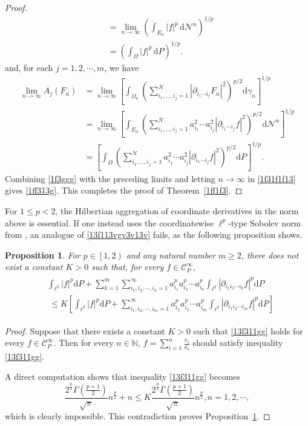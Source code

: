 \documentclass[12pt]{article}
\theoremstyle{plain}
\newtheorem{proposition}[theorem]{Proposition}
\theoremstyle{definition}
\theoremstyle{remark}
\numberwithin{equation}{section}
\newcommand{\nn}{\mathbb{N}}
\begin{document}
\begin{proof}
\[\begin{aligned}
&=\lim_{n\to\infty}
\left(\int_{E_n}|f|^p\,\mathrm d\mathcal N^n\right)^{1/p}\\
&=\left(\int_{\Omega}|f|^p\,\mathrm dP\right)^{1/p}.
\end{aligned}
\]
and, for each $j=1,2,\cdots,m$, we have
\[
\begin{aligned}
\lim_{n\to\infty}A_j(F_n)
&=\lim_{n\to\infty}
\left[
\int_{\Omega_n}
\left(
\sum_{i_1,\ldots,i_j=1}^{N}
|\partial_{i_1\cdots i_j}F_n|^2
\right)^{p/2}\mathrm d\gamma_n
\right]^{1/p}\\
&=\lim_{n\to\infty}
\left[
\int_{E_n}
\left(
\sum_{i_1,\ldots,i_j=1}^{N}
a_{i_1}^2\cdots a_{i_j}^2
|\partial_{i_1\cdots i_j}f|^2
\right)^{p/2}\mathrm d\mathcal N^n
\right]^{1/p}\\
&=
\left[
\int_{\Omega}
\left(
\sum_{i_1,\ldots,i_j=1}^{N}
a_{i_1}^2\cdots a_{i_j}^2
|\partial_{i_1\cdots i_j}f|^2
\right)^{p/2}\mathrm dP
\right]^{1/p}.
\end{aligned}
\]
Combining \eqref{1f3ggg} with the preceding limits and letting $n\to\infty$ in \eqref{1f31f1f13} gives \eqref{1ff313g}.  This completes the proof of Theorem~\ref{1ff1f3}.
\end{proof}
For $1\leqslant p<2$, the Hilbertian aggregation of coordinate derivatives in the norm above is essential.  If one instead uses the coordinatewise $\ell^p$-type Sobolev norm from \cite{WYZZ}, an analogue of \eqref{13f113vgv3v13v} fails, as the following proposition shows.
\begin{proposition}\label{1f3g}
For $p\in \left[ 1,2 \right)$ and any natural number $m\geqslant 2$, there does not exist a constant $K > 0$ such that, for every $f\in \mathscr{C}^{\infty}_P$,
	\begin{eqnarray}\label{13f311gg}
		\begin{aligned}
			&\int_{\ell^{2}} \left| f \right|^{p} \mathrm{d} P+\sum_{k=1}^{m} \sum_{i_{1},i_{2},\cdots ,i_{k}=1}^{\infty} a_{i_{1}}^{p}a_{i_{2}}^{p}\cdots a_{i_{k}}^{p}\int_{\ell^{2}} \left| \partial_{i_{1}i_{2}\cdots i_{k}} f \right|^{p} \mathrm{d} P\\ &\  \leqslant K\left[ \int_{\ell^{2}} \left| f \right|^{p} \mathrm{d} P+\sum_{i_{1},i_{2},\cdots ,i_{m}=1}^{\infty} a_{i_{1}}^{p}a_{i_{2}}^{p}\cdots a_{i_{m}}^{p}\int_{\ell^{2}} \left| \partial_{i_{1}i_{2}\cdots i_{m}} f \right|^{p} \mathrm{d} P \right]\end{aligned}
	\end{eqnarray}
\end{proposition}
\begin{proof}
	Suppose that there exists a constant $K > 0$ such that \eqref{13f311gg} holds for every $f\in \mathscr{C}^{\infty}_P$. Then for every $n\in\nn$, $f=\sum_{i=1}^{n} \frac{x_{i}}{a_{i}}$ should satisfy inequality \eqref{13f311gg}.
	
	A direct computation shows that inequality \eqref{13f311gg} becomes
	$$\frac{2^{\frac{p}{2}}\Gamma \left( \frac{p+1}{2} \right)}{\sqrt{\pi}} n^{\frac{p}{2}}+n\leqslant K\frac{2^{\frac{p}{2}}\Gamma \left( \frac{p+1}{2} \right)}{\sqrt{\pi}} n^{\frac{p}{2}},n=1,2,\cdots,$$
	which is clearly impossible. This contradiction proves Proposition~\ref{1f3g}.
\end{proof}
\end{document}
